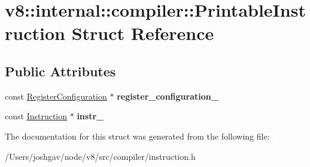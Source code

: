\hypertarget{structv8_1_1internal_1_1compiler_1_1_printable_instruction}{}\section{v8\+:\+:internal\+:\+:compiler\+:\+:Printable\+Instruction Struct Reference}
\label{structv8_1_1internal_1_1compiler_1_1_printable_instruction}
\subsection*{Public Attributes}
\begin{DoxyCompactItemize}
\item 
const \hyperlink{classv8_1_1internal_1_1_register_configuration}{Register\+Configuration} $\ast$ {\bfseries register\+\_\+configuration\+\_\+}\hypertarget{structv8_1_1internal_1_1compiler_1_1_printable_instruction_a9388049029f8e10af09f1d7a14d0bb8e}{}\label{structv8_1_1internal_1_1compiler_1_1_printable_instruction_a9388049029f8e10af09f1d7a14d0bb8e}

\item 
const \hyperlink{classv8_1_1internal_1_1compiler_1_1_instruction}{Instruction} $\ast$ {\bfseries instr\+\_\+}\hypertarget{structv8_1_1internal_1_1compiler_1_1_printable_instruction_af16f646085102d606cce8217ea5648f2}{}\label{structv8_1_1internal_1_1compiler_1_1_printable_instruction_af16f646085102d606cce8217ea5648f2}

\end{DoxyCompactItemize}


The documentation for this struct was generated from the following file\+:\begin{DoxyCompactItemize}
\item 
/\+Users/joshgav/node/v8/src/compiler/instruction.\+h\end{DoxyCompactItemize}
